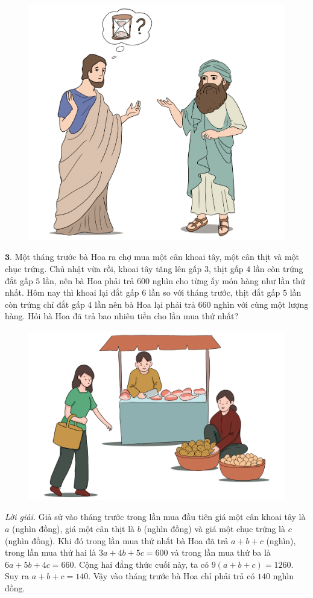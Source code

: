 \begin{multicols}{2}
	\begin{figure}[H]
		\centering
		\vspace*{-10pt}
		\captionsetup{labelformat= empty, justification=centering}
		\includegraphics[width=0.6\linewidth]{Pi1_2_Bai2}
		\vspace*{-10pt}
	\end{figure}
	$\pmb{3.}$ Một tháng trước bà Hoa ra chợ mua một cân khoai tây, một cân thịt và một chục trứng. Chủ nhật vừa rồi, khoai tây tăng lên gấp $3$, thịt gấp $4$ lần còn trứng đắt gấp $5$ lần, nên bà Hoa phải trả $600$ nghìn cho từng ấy món hàng như lần thứ nhất. Hôm nay thì khoai lại đắt gấp $6$ lần so với tháng trước, thịt đắt gấp $5$ lần còn trứng chỉ đắt gấp $4$ lần nên bà Hoa lại phải trả $660$ nghìn với cùng một lượng hàng. Hỏi bà Hoa đã trả bao nhiêu tiền cho lần mua thứ nhất?
	\begin{figure}[H]
		\centering
		\vspace*{-10pt}
		\captionsetup{labelformat= empty, justification=centering}
		\includegraphics[width=0.7\linewidth]{Pi1_2_Bai3}
		\vspace*{-10pt}
	\end{figure}
	\textit{Lời giải.} 	Giả sử vào tháng trước trong lần mua đầu tiên giá một cân khoai tây là $a$ (nghìn đồng), giá một cân thịt là $b$ (nghìn đồng) và giá một chục trứng là $c$ (nghìn đồng). Khi đó trong lần mua thứ nhất bà Hoa đã trả $a + b + c$ (nghìn), trong lần mua thứ hai là $3a+4b+5c = 600$ và trong lần mua thứ ba là $6a + 5b+ 4c = 660$. Cộng hai đẳng thức cuối này, ta có $9(a+b+c)= 1260$. Suy ra $a+b+c = 140$. Vậy vào tháng trước bà Hoa chỉ phải trả có $140$ nghìn đồng.

\end{multicols}
